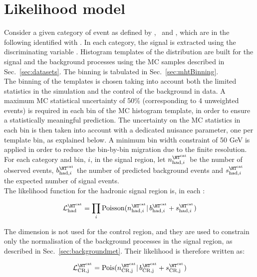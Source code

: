 \section{Likelihood model}
\label{sec:likelihood}

Consider a given category of event as defined by \njet, \nb~and \scalht, which are in the following identified with \htcat. 
In each category, the signal is extracted using the discriminating variable \mht. 
Histogram templates of the \mht distribution are built for the signal and the background processes 
using the MC samples described in Sec.~\ref{sec:datasets}. 
The \mht binning is tabulated in Sec.~\ref{sec:mhtBinning}.\\
The binning of the templates is chosen taking into account both the limited statistics in the simulation and 
the control of the background in data. 
A maximum MC statistical uncertainty of 50\% (corresponding to 4 unweighted events) is required in each bin of the MC histogram template, 
in order to ensure a statistically meaningful prediction. The uncertainty on the MC statistics in each bin is then 
taken into account with a dedicated nuisance parameter, one per template bin, as explained below. 
A minimum bin width constraint of 50 GeV is applied
in order to reduce the bin-by-bin migration due to the finite \mht resolution.\\

For each category \htcat and \mht bin, $i$, in the signal region, let $n^{\htcat}_{\mathrm{had},i}$ be the number of observed events, 
$b^{\htcat}_{\mathrm{had},i}$ the number of predicted background events and $s^{\htcat}_{\mathrm{had},i}$ the expected number of signal events. \\
The likelihood function for the hadronic signal region is, in each \htcat:

\begin{equation}
\mathcal{L}^{\htcat}_{\mathrm{had}}=\prod_i \mathrm{Poisson}(n^{\htcat}_{\mathrm{had},i} |\, b^{\htcat}_{\mathrm{had},i} + s^{\htcat}_{\mathrm{had},i})
\label{eq:hadronicLikelihood}
\end{equation}

The \mht dimension is not used for the control region, and they are used to constrain only the normalisation of the background processes 
in the signal region, as described in Sec.~\ref{sec:backgroundmet}. 
Their likelihood is therefore written as:

\begin{equation}
\mathcal{L}^{\htcat}_{\mathrm{CR,j}}=\mathrm{Pois}(n^{\htcat}_{\mathrm{CR,j}} |\, b^{\htcat}_{\mathrm{CR,j}} + s^{\htcat}_{\mathrm{CR,j}})
\label{eq:controlLikelihood}
\end{equation}

